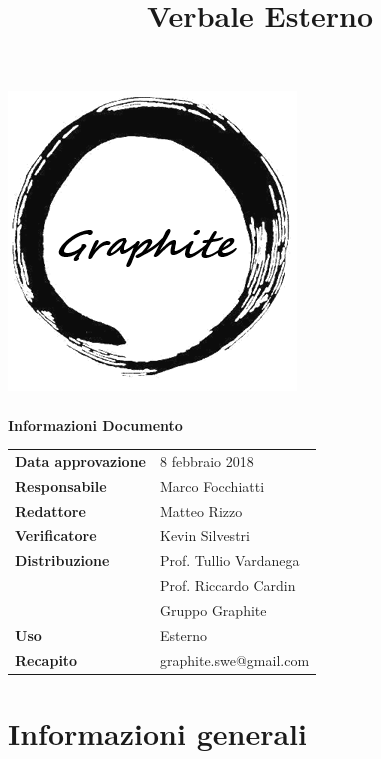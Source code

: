\documentclass[openany,12pt,a4paper]{article}
\title{Verbale Esterno}
\author{}
\begin{document}
 
  \makeatletter 
  \begin{titlepage} 
    \setlength{\headsep}{0pt}   
    \begin{center} 
      \includegraphics[width=0.5\linewidth]{Logo.png}\\[1em] 
      {\huge \bfseries  \@title }\\[10ex] 
      \textbf{\Large Informazioni Documento} \\[2em] 
      \bgroup 
      \def\arraystretch{1.5} 
      \begin{tabular}{l|l} 
        \textbf{Data approvazione} & 8 febbraio 2018 \\ 
        \textbf{Responsabile} & Marco Focchiatti \\ 
        \textbf{Redattore} & Matteo Rizzo \\ 
        \textbf{Verificatore} & Kevin Silvestri \\ 
        \textbf{Distribuzione} & Prof. Tullio Vardanega \\ 
         & Prof. Riccardo Cardin \\ 
         & Gruppo Graphite \\ 
        \textbf{Uso} & Esterno \\ 
        \textbf{Recapito} & graphite.swe@gmail.com \\ 
      \end{tabular} 
    \egroup 
    \end{center} 
  \end{titlepage} 
  \makeatother 
 
  \thispagestyle{empty} 
  \newpage 
   
  \tableofcontents 
  \newpage 
   
  \section{Informazioni generali} 
   
\end{document}
